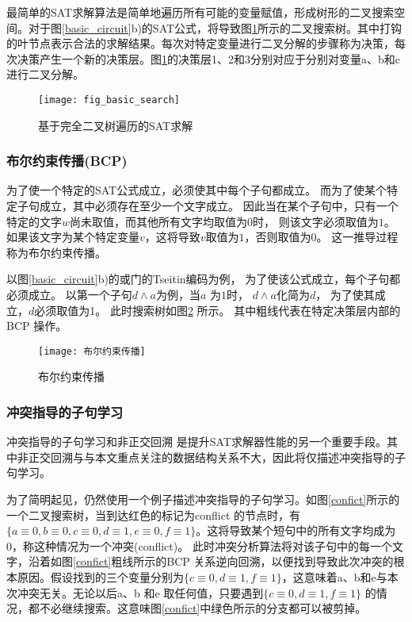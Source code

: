 最简单的SAT求解算法是简单地遍历所有可能的变量赋值，形成树形的二叉搜索空间。对于图\ref{basic_circuit}b)的SAT公式，将导致图\ref{basic_search}所示的二叉搜索树。其中打钩的叶节点表示合法的求解结果。每次对特定变量进行二叉分解的步骤称为决策，每次决策产生一个新的决策层。图\ref{basic_search}的决策层1、2和3分别对应于分别对变量a、b和c进行二叉分解。

\begin{figure}[b] %
  \centering
  \texttt{[image: fig\_basic\_search]}
  \caption{基于完全二叉树遍历的SAT求解}
  \label{basic_search}
\end{figure}

\subsubsection{布尔约束传播(BCP)}
为了使一个特定的SAT公式成立，必须使其中每个子句都成立。
而为了使某个特定子句成立，其中必须存在至少一个文字成立。
因此当在某个子句中，只有一个特定的文字$w$尚未取值，而其他所有文字均取值为$0$时，
则该文字必须取值为$1$。
如果该文字为某个特定变量$v$，这将导致$v$取值为$1$，否则取值为$0$。
这一推导过程称为布尔约束传播。

以图\ref{basic_circuit}b)的或门的Tseitin编码为例，
为了使该公式成立，每个子句都必须成立。
以第一个子句$d \wedge a$为例，当$a$ 为$1$时，
$d \wedge a$化简为$d$，
为了使其成立，$d$必须取值为1。
此时搜索树如图\ref{BCP} 所示。
其中粗线代表在特定决策层内部的BCP 操作。

\begin{figure}[t] %
  \centering
  \texttt{[image: 布尔约束传播]}
  \caption{布尔约束传播}
  \label{BCP}
\end{figure}

\subsubsection{冲突指导的子句学习}
冲突指导的子句学习和非正交回溯 是提升SAT求解器性能的另一个重要手段。其中非正交回溯与与本文重点关注的数据结构关系不大，因此将仅描述冲突指导的子句学习。

为了简明起见，仍然使用一个例子描述冲突指导的子句学习。如图\ref{confict}所示的一个二叉搜索树，当到达红色的标记为conflict 的节点时，有$\{a \equiv 0,b \equiv 0, c \equiv 0,d \equiv1,e \equiv 0,f \equiv1\}$。这将导致某个短句中的所有文字均成为0，称这种情况为一个冲突(conflict)。 此时冲突分析算法将对该子句中的每一个文字，沿着如图\ref{confict}粗线所示的BCP 关系逆向回溯，以便找到导致此次冲突的根本原因。假设找到的三个变量分别为$\{c \equiv 0,d \equiv 1,f \equiv 1\}$，这意味着a、b和e与本次冲突无关。无论以后a、b 和e 取任何值，只要遇到$\{c \equiv 0,d \equiv 1,f \equiv 1\}$ 的情况，都不必继续搜索。这意味图\ref{confict}中绿色所示的分支都可以被剪掉。

